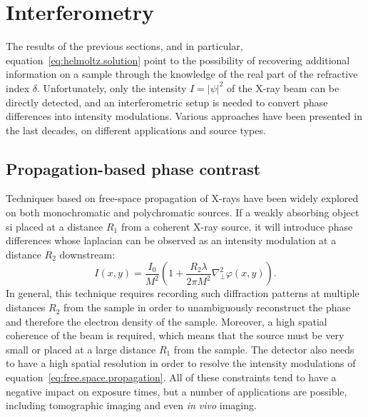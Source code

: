 \section{Interferometry}

The results of the previous sections, and in particular,
equation~\eqref{eq:helmoltz.solution} point to the possibility of recovering
additional information on a sample through the knowledge of the real part of
the refractive index $\delta$. Unfortunately, only the intensity $I =
|\psi|^2$ of the X-ray beam can be directly detected, and an interferometric
setup is needed to convert phase differences into intensity modulations.
Various approaches have been presented in the last decades, on different
applications and source types.

\subsection{Propagation-based phase contrast}
Techniques based on free-space propagation of X-rays have been widely
explored on both monochromatic and polychromatic sources. If a weakly
absorbing object si placed at a distance $R_1$ from a coherent X-ray source,
it will introduce phase differences whose laplacian can be observed as an
intensity modulation at a distance $R_2$ downstream:
\begin{equation}
    I(x, y) = \frac{I_0}{M^2}\left(1 + \frac{R_2\lambda}{2\pi M^2}\nabla_\perp^2
    \varphi(x, y)\right).
    \label{eq:free.space.propagation}
\end{equation}
In general, this technique requires recording such diffraction patterns at
multiple distances $R_2$ from the sample in order to unambiguously
reconstruct the phase and therefore the electron density of the sample.
Moreover, a high spatial coherence of the beam is required, which means
that the source must be very small or placed at a large distance $R_1$ from
the sample. The detector also needs to have a high spatial resolution in
order to resolve the intensity modulations of
equation~\eqref{eq:free.space.propagation}. All of these constraints tend to
have a negative impact on exposure times, but a number of applications are
possible, including tomographic imaging and even \emph{in vivo} imaging.

